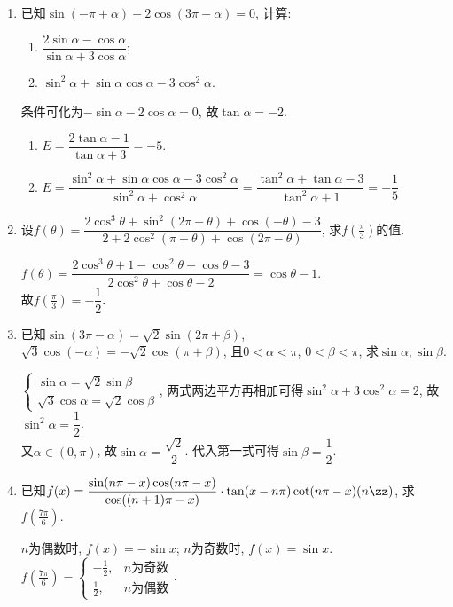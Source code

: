 \begin{enumerate}
\item 已知$\sin(-\pi+\alpha)+2\cos(3\pi-\alpha)=0$, 计算: 
\begin{enumerate}[(1)]
\item $\dfrac{2\sin\alpha-\cos\alpha}{\sin\alpha+3\cos\alpha}$; 
\item $\sin^2\alpha+\sin\alpha\cos\alpha-3\cos^2\alpha$. 
\end{enumerate}
\begin{jieda}
条件可化为$-\sin\alpha-2\cos\alpha=0$, 故$\tan\alpha=-2$. 
\begin{enumerate}[(1)]
\item $E=\dfrac{2\tan\alpha-1}{\tan\alpha+3}=-5$. 
\item $E=\dfrac{\sin^2\alpha+\sin\alpha\cos\alpha-3\cos^2\alpha}{\sin^2\alpha+\cos^2\alpha}=\dfrac{\tan^2\alpha+\tan\alpha-3}{\tan^2\alpha+1}=-\dfrac{1}{5}$
\end{enumerate}
\end{jieda}

\item 设$f(\theta)=\dfrac{2\cos^3\theta+\sin^2(2\pi-\theta)+\cos(-\theta)-3}{2+2\cos^2(\pi+\theta)+\cos(2\pi-\theta)}$, 求$f(\frac{\pi}{3})$的值. 
\begin{jieda}
$f(\theta)=\dfrac{2\cos^3\theta+1-\cos^2\theta+\cos\theta-3}{2\cos^2\theta+\cos\theta-2}=\cos\theta-1$. \\
故$f(\frac{\pi}{3})=-\dfrac{1}{2}$. 
\end{jieda}

\item 已知$\sin(3\pi-\alpha)=\sqrt2\sin(2\pi+\beta)$, $\sqrt3\cos(-\alpha)=-\sqrt2\cos(\pi+\beta)$, 
且$0<\alpha<\pi$, $0<\beta<\pi$, 求$\sin\alpha,\sin\beta$. 
\begin{jieda}
$\begin{cases}
\sin\alpha=\sqrt{2}\sin\beta\\
\sqrt{3}\cos\alpha=\sqrt{2}\cos\beta
\end{cases}$, 两式两边平方再相加可得$\sin^2\alpha+3\cos^2\alpha=2$, 故$\sin^2\alpha=\dfrac{1}{2}$. \\
又$\alpha\in(0,\pi)$, 故$\sin\alpha=\dfrac{\sqrt{2}}{2}$. 
代入第一式可得$\sin\beta=\dfrac{1}{2}$. 
\end{jieda}

\item 已知$f(x)=\dfrac{\sin(n\pi-x)\cos(n\pi-x)}{\cos((n+1)\pi-x)}\cdot\tan(x-n\pi)\cot(n\pi-x)(n\zz)$, 求$f(\frac{7\pi}{6})$. 
\begin{jieda}
$n$为偶数时, $f(x)=-\sin{x}$; $n$为奇数时, $f(x)=\sin{x}$. \\
$f(\frac{7\pi}{6})=\begin{cases}
-\frac{1}{2}, & n\text{为奇数}\\
\frac{1}{2}, & n\text{为偶数}
\end{cases}$. 
\end{jieda}

\end{enumerate}




